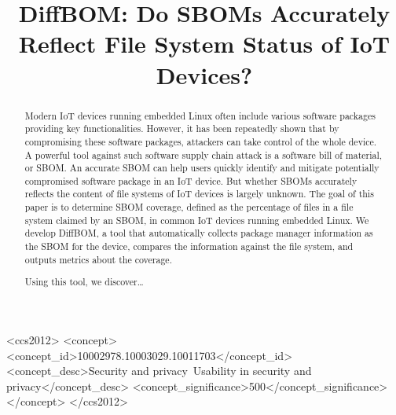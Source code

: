 \documentclass[sigconf, anonymous]{acmart}
\begin{document}
\title{DiffBOM: Do SBOMs Accurately Reflect File System Status of IoT Devices?} %

\begin{abstract}

Modern IoT devices running embedded Linux often include various software
    packages providing key functionalities. However, it has been repeatedly
    shown that by compromising these software packages, attackers can take
    control of the whole device. A powerful tool against such software supply
    chain attack is a software bill of material, or SBOM. An accurate SBOM can
    help users quickly identify and mitigate potentially compromised software
    package in an IoT device. But whether SBOMs accurately reflects the content
    of file systems of IoT devices is largely unknown. The goal of this paper
    is to determine SBOM coverage, defined as the percentage of files in a file
    system claimed by an SBOM, in common IoT devices running embedded Linux. We
    develop DiffBOM, a tool that automatically collects package manager
    information as the SBOM for the device, compares the information against
    the file system, and outputs metrics about the coverage.\par
Using this tool, we discover…
\end{abstract}

\begin{CCSXML}
<ccs2012>
<concept>
<concept_id>10002978.10003029.10011703</concept_id>
<concept_desc>Security and privacy~Usability in security and privacy</concept_desc>
<concept_significance>500</concept_significance>
</concept>
</ccs2012>
\end{CCSXML}



\maketitle



\end{document}
